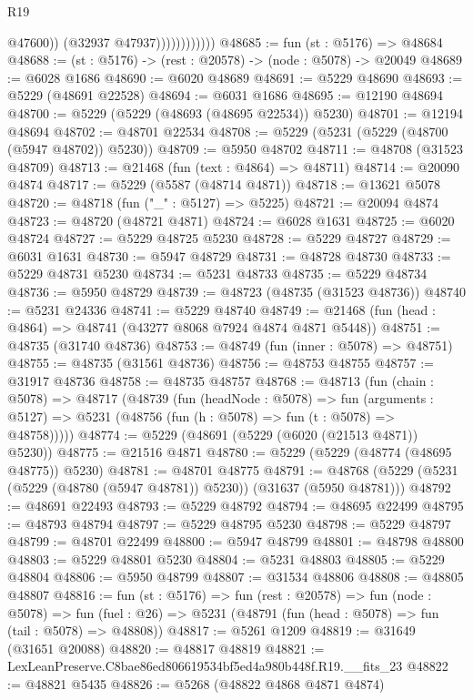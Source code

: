 \begin{lexlean}{R19}
\begin{coremodule}
                              @47600))
                          (@32937 @47937))))))))))))
@48685 := fun (st : @5176) => @48684
@48688 := (st : @5176) -> (rest : @20578) -> (node : @5078) -> @20049
@48689 := @6028 @1686
@48690 := @6020 @48689
@48691 := @5229 @48690
@48693 := @5229 (@48691 @22528)
@48694 := @6031 @1686
@48695 := @12190 @48694
@48700 := @5229 (@5229 (@48693 (@48695 @22534)) @5230)
@48701 := @12194 @48694
@48702 := @48701 @22534
@48708 := @5229 (@5231 (@5229 (@48700 (@5947 @48702)) @5230))
@48709 := @5950 @48702
@48711 := @48708 (@31523 @48709)
@48713 := @21468 (fun (text : @4864) => @48711)
@48714 := @20090 @4874
@48717 := @5229 (@5587 (@48714 @4871))
@48718 := @13621 @5078
@48720 := @48718 (fun ("_" : @5127) => @5225)
@48721 := @20094 @4874
@48723 := @48720 (@48721 @4871)
@48724 := @6028 @1631
@48725 := @6020 @48724
@48727 := @5229 @48725 @5230
@48728 := @5229 @48727
@48729 := @6031 @1631
@48730 := @5947 @48729
@48731 := @48728 @48730
@48733 := @5229 @48731 @5230
@48734 := @5231 @48733
@48735 := @5229 @48734
@48736 := @5950 @48729
@48739 := @48723 (@48735 (@31523 @48736))
@48740 := @5231 @24336
@48741 := @5229 @48740
@48749 := @21468 (fun (head : @4864) => @48741 (@43277 @8068 @7924 @4874 @4871 @5448))
@48751 := @48735 (@31740 @48736)
@48753 := @48749 (fun (inner : @5078) => @48751)
@48755 := @48735 (@31561 @48736)
@48756 := @48753 @48755
@48757 := @31917 @48736
@48758 := @48735 @48757
@48768 := @48713
    (fun (chain : @5078) =>
    @48717
      (@48739
        (fun (headNode : @5078) =>
        fun (arguments : @5127) => @5231 (@48756 (fun (h : @5078) => fun (t : @5078) => @48758)))))
@48774 := @5229 (@48691 (@5229 (@6020 (@21513 @4871)) @5230))
@48775 := @21516 @4871
@48780 := @5229 (@5229 (@48774 (@48695 @48775)) @5230)
@48781 := @48701 @48775
@48791 := @48768 (@5229 (@5231 (@5229 (@48780 (@5947 @48781)) @5230)) (@31637 (@5950 @48781)))
@48792 := @48691 @22493
@48793 := @5229 @48792
@48794 := @48695 @22499
@48795 := @48793 @48794
@48797 := @5229 @48795 @5230
@48798 := @5229 @48797
@48799 := @48701 @22499
@48800 := @5947 @48799
@48801 := @48798 @48800
@48803 := @5229 @48801 @5230
@48804 := @5231 @48803
@48805 := @5229 @48804
@48806 := @5950 @48799
@48807 := @31534 @48806
@48808 := @48805 @48807
@48816 := fun (st : @5176) =>
  fun (rest : @20578) =>
  fun (node : @5078) =>
  fun (fuel : @26) => @5231 (@48791 (fun (head : @5078) => fun (tail : @5078) => @48808))
@48817 := @5261 @1209
@48819 := @31649 (@31651 @20088)
@48820 := @48817 @48819
@48821 := LexLeanPreserve.C8bae86ed806619534bf5ed4a980b448f.R19.__fits_23
@48822 := @48821 @5435
@48826 := @5268 (@48822 @4868 @4871 @4874)

\end{coremodule}
\end{lexlean}
